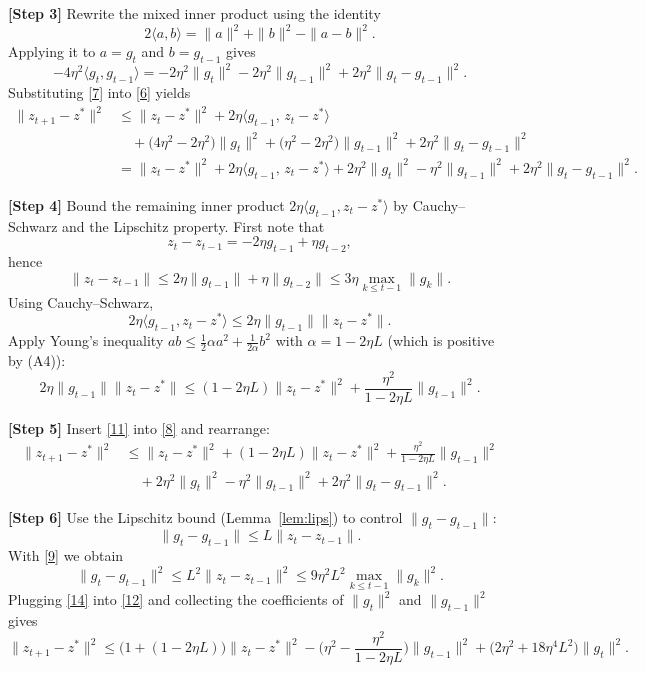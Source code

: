 \documentclass{article}
\begin{document}
\noindent\textbf{[Step 3]} Rewrite the mixed inner product using the identity
\[
2\langle a,b\rangle = \|a\|^{2}+\|b\|^{2}-\|a-b\|^{2}.
\]
Applying it to $a=g_t$ and $b=g_{t-1}$ gives
\[
-4\eta^{2}\langle g_t,g_{t-1}\rangle
= -2\eta^{2}\|g_t\|^{2}
  -2\eta^{2}\|g_{t-1}\|^{2}
  +2\eta^{2}\|g_t-g_{t-1}\|^{2}.
\tag{7}
\]
Substituting \eqref{7} into \eqref{6} yields
\[
\begin{aligned}
\|z_{t+1}-z^*\|^{2}
&\le \|z_t-z^*\|^{2}
   +2\eta\langle g_{t-1},\,z_t-z^*\rangle \\[1mm]
&\quad +\big(4\eta^{2}-2\eta^{2}\big)\|g_t\|^{2}
   +\big(\eta^{2}-2\eta^{2}\big)\|g_{t-1}\|^{2}
   +2\eta^{2}\|g_t-g_{t-1}\|^{2}\\[1mm]
&= \|z_t-z^*\|^{2}
   +2\eta\langle g_{t-1},\,z_t-z^*\rangle
   +2\eta^{2}\|g_t\|^{2}
   -\eta^{2}\|g_{t-1}\|^{2}
   +2\eta^{2}\|g_t-g_{t-1}\|^{2}.
\end{aligned}
\tag{8}
\]

\noindent\textbf{[Step 4]} Bound the remaining inner product $2\eta\langle g_{t-1},z_t-z^*\rangle$ by Cauchy–Schwarz and the Lipschitz property.
First note that
\[
z_t-z_{t-1}= -2\eta g_{t-1}+\eta g_{t-2},
\]
hence
\[
\|z_t-z_{t-1}\|\le 2\eta\|g_{t-1}\|+\eta\|g_{t-2}\|\le 3\eta\max_{k\le t-1}\|g_k\|.
\tag{9}
\]
Using Cauchy–Schwarz,
\[
2\eta\langle g_{t-1},z_t-z^*\rangle
\le 2\eta\|g_{t-1}\|\|z_t-z^*\|.
\tag{10}
\]
Apply Young’s inequality $ab\le \frac{1}{2}\alpha a^{2}+ \frac{1}{2\alpha}b^{2}$ with $\alpha=1-2\eta L$ (which is positive by (A4)):
\[
2\eta\|g_{t-1}\|\|z_t-z^*\|
\le (1-2\eta L)\|z_t-z^*\|^{2}
   +\frac{\eta^{2}}{1-2\eta L}\|g_{t-1}\|^{2}.
\tag{11}
\]

\noindent\textbf{[Step 5]} Insert \eqref{11} into \eqref{8} and rearrange:
\[
\begin{aligned}
\|z_{t+1}-z^*\|^{2}
&\le \|z_t-z^*\|^{2}
   +(1-2\eta L)\|z_t-z^*\|^{2}
   +\frac{\eta^{2}}{1-2\eta L}\|g_{t-1}\|^{2}\\[1mm]
&\quad +2\eta^{2}\|g_t\|^{2}
   -\eta^{2}\|g_{t-1}\|^{2}
   +2\eta^{2}\|g_t-g_{t-1}\|^{2}.
\end{aligned}
\tag{12}
\]

\noindent\textbf{[Step 6]} Use the Lipschitz bound (Lemma~\ref{lem:lips}) to control $\|g_t-g_{t-1}\|$:
\[
\|g_t-g_{t-1}\|\le L\|z_t-z_{t-1}\|.
\tag{13}
\]
With \eqref{9} we obtain
\[
\|g_t-g_{t-1}\|^{2}\le L^{2}\|z_t-z_{t-1}\|^{2}
\le 9\eta^{2}L^{2}\max_{k\le t-1}\|g_k\|^{2}.
\tag{14}
\]
Plugging \eqref{14} into \eqref{12} and collecting the coefficients of $\|g_t\|^{2}$ and $\|g_{t-1}\|^{2}$ gives
\[
\|z_{t+1}-z^*\|^{2}
\le \big(1+ (1-2\eta L)\big)\|z_t-z^*\|^{2}
   -\big(\eta^{2} -\frac{\eta^{2}}{1-2\eta L}\big)\|g_{t-1}\|^{2}
   +\big(2\eta^{2}+18\eta^{4}L^{2}\big)\|g_t\|^{2}.
\tag{15}
\]
\end{document}
